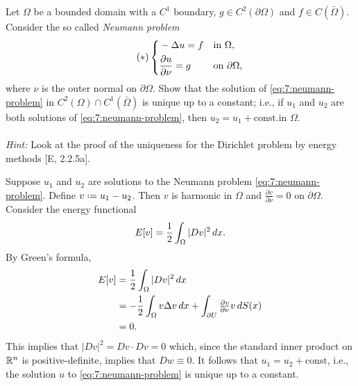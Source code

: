 \begin{problem}
  Let \(\Omega\) be a bounded domain with a \(C^1\) boundary, \(g\in
  C^2(\partial\Omega)\) and \(f\in C(\bar\Omega)\). Consider the so called
  \emph{Neumann problem}
  \[
    \label{eq:7:neumann-problem}%
    \tag{\(*\)}%
    \left\{
      \begin{aligned}
        &-\Lap u=f&&\text{in \(\Omega\),}\\
        &\frac{\partial u}{\partial\nu}=g&&\text{on \(\partial\Omega\),}
      \end{aligned}
    \right.
  \]
  where \(\nu\) is the outer normal on \(\partial\Omega\). Show that the
  solution of \eqref{eq:7:neumann-problem} in
  \(C^2(\Omega)\cap C^1(\bar\Omega)\) is unique up to a constant; i.e., if
  \(u_1\) and \(u_2\) are both solutions of \eqref{eq:7:neumann-problem},
  then \(u_2=u_1+\text{const.}\)\@ in \(\Omega\).
  \\\\
  \emph{Hint:} Look at the proof of the uniqueness for the Dirichlet
  problem by energy methods [E, 2.2.5a].
\end{problem}
\begin{solution*}
  Suppose \(u_1\) and \(u_2\) are solutions to the Neumann problem
  \eqref{eq:7:neumann-problem}. Define \(v\defeq u_1-u_2\). Then \(v\) is
  harmonic in \(\Omega\) and \(\frac{\partial v}{\partial \nu}=0\) on
  \(\partial\Omega\). Consider the energy functional
  \[
    E[v]=\frac{1}{2}\int_\Omega|Dv|^2\mathop{}\!d x.
  \]
  By Green's formula,
  \begin{align*}
    E[v]
    &=\frac{1}{2}\int_\Omega|Dv|^2\mathop{}\!d x\\
    &=-\frac{1}{2}\int_\Omega v\Delta v\mathop{}\!d x
      +\int_{\partial U}\tfrac{\partial
      v}{\partial\nu} v\mathop{}\!d S(x)\\
    &=0.
  \end{align*}
  This implies that \(|Dv|^2=Dv\cdot Dv=0\) which, since the standard inner
  product on \(\mathbb{R}^n\) is positive-definite, implies that \(Dw\equiv
  0\). It follows that \(u_1=u_2+\text{const}\), i.e., the solution \(u\)
  to \eqref{eq:7:neumann-problem} is unique up to a constant.
\end{solution*}

